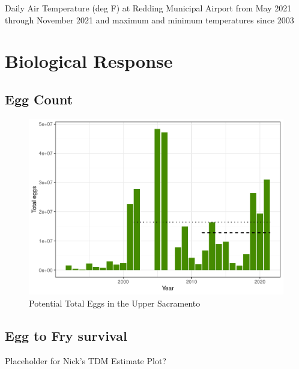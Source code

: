 \documentclass[
]{book}
\theoremstyle{definition}
\theoremstyle{definition}
\theoremstyle{definition}
\theoremstyle{definition}
\theoremstyle{remark}
\begin{document}
\label{fig:KRDDatemp-fig}Daily Air Temperature (deg F) at Redding Municipal Airport from May 2021 through November 2021 and maximum and minimum temperatures since 2003

\hypertarget{biological-response-1}{%
\section{Biological Response}\label{biological-response-1}}

\hypertarget{egg-count}{%
\subsection{Egg Count}\label{egg-count}}

\begin{figure}
\centering
\includegraphics{_main_files/figure-latex/totaleggs-fig-1.pdf}
\caption{\label{fig:totaleggs-fig}Potential Total Eggs in the Upper Sacramento}
\end{figure}

\hypertarget{egg-to-fry-survival}{%
\subsection{Egg to Fry survival}\label{egg-to-fry-survival}}

Placeholder for Nick's TDM Estimate Plot?
\end{document}
